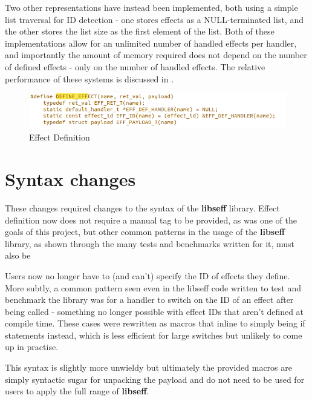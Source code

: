 \documentclass[logo,bsc,singlespacing,parskip,online]{infthesis}
\begin{document}
Two other representations have instead been implemented, both using a simple list traversal for ID detection - one stores effects as a NULL-terminated list, and the other stores the list size as the first element of the list. Both of these implementations allow for an unlimited number of handled effects per handler, and importantly the amount of memory required does not depend on the number of defined effects - only on the number of handled effects. The relative performance of these systems is discussed in .

\begin{figure}[ht]
    \centering
    \includegraphics[width=1\linewidth]{defeff.png}
    \caption{Effect Definition}
    \label{fig:joooo}
\end{figure}

\section{Syntax changes} \label{Syntax}

These changes required changes to the syntax of the \textbf{libseff} library. Effect definition now does not require a manual tag to be provided, as was one of the goals of this project, but other common patterns in the usage of the \textbf{libseff} library, as shown through the many tests and benchmarks written for it, must also be 

Users now no longer have to (and can't) specify the ID of effects they define. More subtly, a common pattern seen even in the libseff code written to test and benchmark the library was for a handler to switch on the ID of an effect after being called - something no longer possible with effect IDs that aren't defined at compile time. These cases were rewritten as macros that inline to simply being if statements instead, which is less efficient for large switches but unlikely to come up in practise.

This syntax is slightly more unwieldy but ultimately the provided macros are simply syntactic sugar for unpacking the payload and do not need to be used for users to apply the full range of \textbf{libseff}. 
\end{document}
